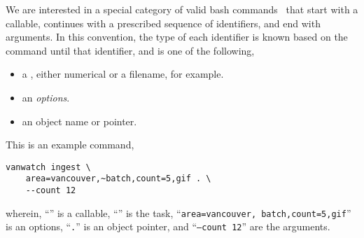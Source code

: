 We are interested in a special category of valid bash commands~\cite{shell_syntax} that start with a callable, continues with a prescribed sequence of identifiers, and end with arguments. In this convention, the type of each identifier is known based on the command until that identifier, and is one of the following,
%
\begin{itemize}
    \item a , either numerical or a filename, for example.
    \item an \emph{options}.
    \item an object name or pointer.
\end{itemize}
%
This is an example command,
%
\begin{verbatim}
vanwatch ingest \
    area=vancouver,~batch,count=5,gif . \
    --count 12
\end{verbatim}
%
wherein, ``'' is a callable, ``'' is the task, ``\texttt{area=vancouver,~batch,count=5,gif}'' is an options, ``\texttt{.}'' is an object pointer, and ``\texttt{--count 12}'' are the arguments.